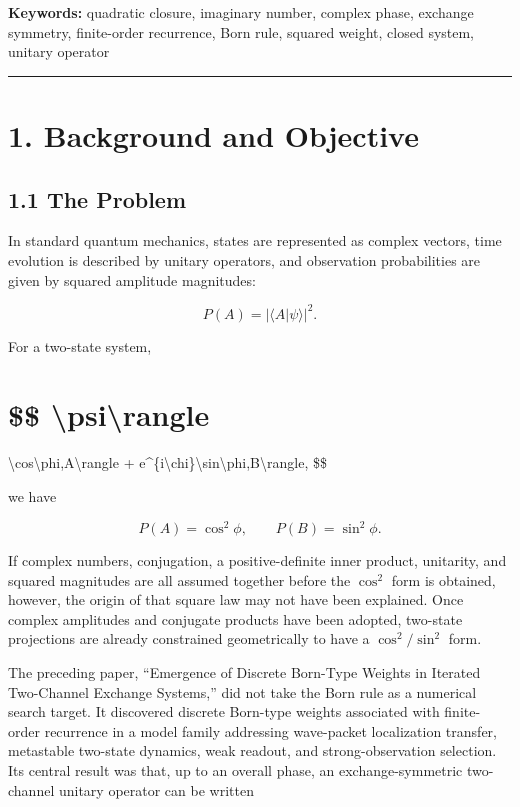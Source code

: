 \documentclass[
  a4paper,
  10pt]{article}
\begin{document}
\textbf{Keywords:} quadratic closure, imaginary number, complex phase,
exchange symmetry, finite-order recurrence, Born rule, squared weight,
closed system, unitary operator

\begin{center}\rule{0.5\linewidth}{0.5pt}\end{center}

\section{1. Background and Objective}\label{1-background-and-objective}

\subsection{1.1 The Problem}\label{11-the-problem}

In standard quantum mechanics, states are represented as complex
vectors, time evolution is described by unitary operators, and
observation probabilities are given by squared amplitude magnitudes:

\[
P(A)=|\langle A|\psi\rangle|^2.
\]

For a two-state system,

\section{\$\$
\textbar\textbackslash psi\textbackslash rangle}\label{-psirangle}

\textbackslash cos\textbackslash phi,\textbar A\textbackslash rangle +
e\^{}\{i\textbackslash chi\}\textbackslash sin\textbackslash phi,\textbar B\textbackslash rangle,
\$\$

we have

\[
P(A)=\cos^2\phi,
\qquad
P(B)=\sin^2\phi.
\]

If complex numbers, conjugation, a positive-definite inner product,
unitarity, and squared magnitudes are all assumed together before the
\(\cos^2\) form is obtained, however, the origin of that square law may
not have been explained. Once complex amplitudes and conjugate products
have been adopted, two-state projections are already constrained
geometrically to have a \(\cos^2/\sin^2\) form.

The preceding paper, ``Emergence of Discrete Born-Type Weights in
Iterated Two-Channel Exchange Systems,'' did not take the Born rule as a
numerical search target. It discovered discrete Born-type weights
associated with finite-order recurrence in a model family addressing
wave-packet localization transfer, metastable two-state dynamics, weak
readout, and strong-observation selection. Its central result was that,
up to an overall phase, an exchange-symmetric two-channel unitary
operator can be written
\end{document}
